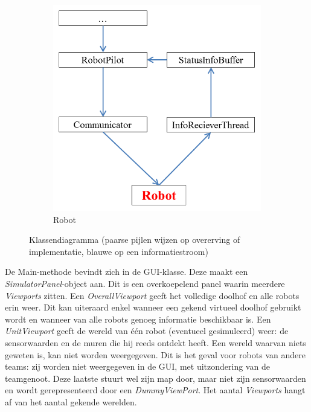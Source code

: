 \documentclass[tt2]{penoverslag}
\begin{document}
\begin{landscape}
\begin{figure}
\begin{subfigure}{0.45\textwidth}
		\includegraphics[width=\textwidth]{KlasRobot}
	\caption{Robot}
\end{subfigure}
\caption[Klassendiagramma]{Klassendiagramma (paarse pijlen wijzen op overerving of implementatie, blauwe op een informatiestroom)}
\label{fig:klasDia}
\end{figure}
\end{landscape}

De Main-methode bevindt zich in de GUI-klasse. Deze maakt een \textit{SimulatorPanel}-object aan. Dit is een overkoepelend panel waarin meerdere \textit{Viewports} zitten. Een \textit{OverallViewport} geeft het volledige doolhof en alle robots erin weer. Dit kan uiteraard enkel wanneer een gekend virtueel doolhof gebruikt wordt en wanneer van alle robots genoeg informatie beschikbaar is. Een \textit{UnitViewport} geeft de wereld van \'e\'en robot (eventueel gesimuleerd) weer: de sensorwaarden en de muren die hij reeds ontdekt heeft. Een wereld waarvan niets geweten is, kan niet worden weergegeven. Dit is het geval voor robots van andere teams: zij worden niet weergegeven in de GUI, met uitzondering van de teamgenoot. Deze laatste stuurt wel zijn map door, maar niet zijn sensorwaarden en wordt gerepresenteerd door een \textit{DummyViewPort}. Het aantal \textit{Viewports} hangt af van het aantal gekende werelden.\\
\end{document}
